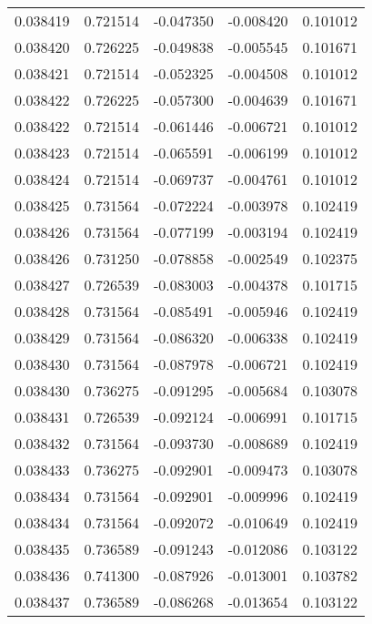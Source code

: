 \begin{tabular}{lrrrr}
0.038419    &  0.721514 & -0.047350 & -0.008420 &             0.101012 \\
0.038420    &  0.726225 & -0.049838 & -0.005545 &             0.101671 \\
0.038421    &  0.721514 & -0.052325 & -0.004508 &             0.101012 \\
0.038422    &  0.726225 & -0.057300 & -0.004639 &             0.101671 \\
0.038422    &  0.721514 & -0.061446 & -0.006721 &             0.101012 \\
0.038423    &  0.721514 & -0.065591 & -0.006199 &             0.101012 \\
0.038424    &  0.721514 & -0.069737 & -0.004761 &             0.101012 \\
0.038425    &  0.731564 & -0.072224 & -0.003978 &             0.102419 \\
0.038426    &  0.731564 & -0.077199 & -0.003194 &             0.102419 \\
0.038426    &  0.731250 & -0.078858 & -0.002549 &             0.102375 \\
0.038427    &  0.726539 & -0.083003 & -0.004378 &             0.101715 \\
0.038428    &  0.731564 & -0.085491 & -0.005946 &             0.102419 \\
0.038429    &  0.731564 & -0.086320 & -0.006338 &             0.102419 \\
0.038430    &  0.731564 & -0.087978 & -0.006721 &             0.102419 \\
0.038430    &  0.736275 & -0.091295 & -0.005684 &             0.103078 \\
0.038431    &  0.726539 & -0.092124 & -0.006991 &             0.101715 \\
0.038432    &  0.731564 & -0.093730 & -0.008689 &             0.102419 \\
0.038433    &  0.736275 & -0.092901 & -0.009473 &             0.103078 \\
0.038434    &  0.731564 & -0.092901 & -0.009996 &             0.102419 \\
0.038434    &  0.731564 & -0.092072 & -0.010649 &             0.102419 \\
0.038435    &  0.736589 & -0.091243 & -0.012086 &             0.103122 \\
0.038436    &  0.741300 & -0.087926 & -0.013001 &             0.103782 \\
0.038437    &  0.736589 & -0.086268 & -0.013654 &             0.103122 \\

\end{tabular}
